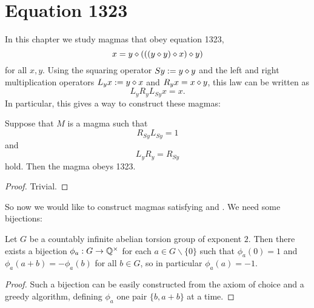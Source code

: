 \chapter{Equation 1323}\label{1323-chapter}

In this chapter we study magmas that obey equation 1323,
\begin{equation}\label{1323}
  x = y \diamond (((y \diamond y) \diamond x) \diamond y)
\end{equation}
for all $x,y$.  Using the squaring operator $Sy := y \diamond y$ and the left and right multiplication operators $L_y x := y \diamond x$ and $R_y x = x \diamond y$, this law can be written as
$$ L_y R_y L_{Sy} x = x.$$
In particular, this gives a way to construct these magmas:

\begin{lemma}\label{1323-construct}\leanok{}  Suppose that $M$ is a magma such that
  \begin{equation}\label{lr}
    R_{Sy} L_{Sy} = 1
   \end{equation}
and
\begin{equation}\label{lr-simp}
  L_{y} R_{y} = R_{Sy}
\end{equation}
hold.  Then the magma obeys 1323.
\end{lemma}

\begin{proof} Trivial.
\end{proof}

 So now we would like to construct magmas satisfying  and .  We need some bijections:

 \begin{lemma}[Bijections]\label{bij}\leanok{}
  Let $G$ be a countably infinite abelian torsion group of exponent $2$.  Then there exists a bijection $\phi_a: G \to \mathbb{Q}^\times$ for each $a \in G \backslash \{0\}$ such that
 $\phi_a(0) = 1$ and $\phi_a(a+b) = -\phi_a(b)$ for all $b \in G$, so in particular $\phi_a(a)=-1$.
 \end{lemma}

 \begin{proof}
  Such a bijection can be easily constructed from the axiom of choice and a greedy algorithm, defining $\phi_a$ one pair $\{b,a+b\}$ at a time.
 \end{proof}



